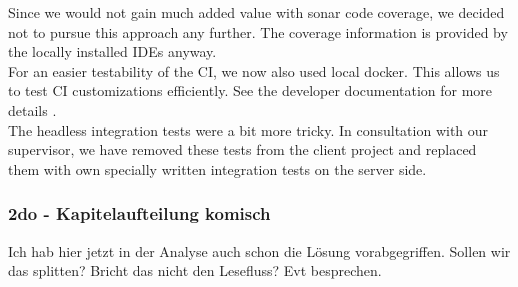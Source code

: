 Since we would not gain much added value with sonar code coverage, we decided not to pursue this approach any further. The coverage information is provided by the locally installed IDEs anyway. 
\\

For an easier testability of the CI, we now also used local docker. This allows us to test CI customizations efficiently. See the developer documentation for more details \cite{dev}. \\

The headless integration tests were a bit more tricky.
In consultation with our supervisor, we have removed these tests from the client project and replaced them with own specially written integration tests on the server side.

\subsubsection{2do - Kapitelaufteilung komisch}
Ich hab hier jetzt in der Analyse auch schon die Lösung vorabgegriffen. Sollen wir das splitten? Bricht das nicht den Lesefluss? Evt besprechen.
